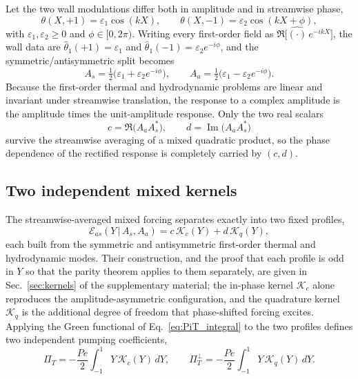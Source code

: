\documentclass[12pt,a4paper]{article}
\newcommand{\Pe}{\mathit{Pe}}
\newcommand{\PiT}{\Pi_T}
\begin{document}
Let the two wall modulations differ both in amplitude and in streamwise phase,
\begin{equation}
  \theta(X,+1)=\varepsilon_1\cos(kX),\qquad
  \theta(X,-1)=\varepsilon_2\cos(kX+\phi),
  \label{eq:phase_forcing}
\end{equation}
with $\varepsilon_1,\varepsilon_2\ge0$ and $\phi\in[0,2\pi)$. Writing every first-order
field as $\Re\!\big[\widehat{(\cdot)}\,e^{-ikX}\big]$, the wall data are
$\widehat\theta_1(+1)=\varepsilon_1$ and
$\widehat\theta_1(-1)=\varepsilon_2 e^{-i\phi}$, and the symmetric/antisymmetric
split becomes
\begin{equation}
  A_s=\tfrac12\big(\varepsilon_1+\varepsilon_2e^{-i\phi}\big),\qquad
  A_a=\tfrac12\big(\varepsilon_1-\varepsilon_2e^{-i\phi}\big).
  \label{eq:complex_amps}
\end{equation}
Because the first-order thermal and hydrodynamic problems are linear and invariant
under streamwise translation, the response to a complex amplitude is the amplitude
times the unit-amplitude response. Only the two real scalars
\begin{equation}
  c=\Re\!\big(A_aA_s^{*}\big),\qquad
  d=\operatorname{Im}\!\big(A_aA_s^{*}\big)
  \label{eq:cd_def}
\end{equation}
survive the streamwise averaging of a mixed quadratic product, so the phase
dependence of the rectified response is completely carried by $(c,d)$.

\subsection{Two independent mixed kernels}

The streamwise-averaged mixed forcing separates exactly into two fixed profiles,
\begin{equation}
  \mathcal E_{as}(Y\,|\,A_s,A_a)
  =c\,\mathcal K_c(Y)+d\,\mathcal K_q(Y),
  \label{eq:mixed_forcing_two}
\end{equation}
each built from the symmetric and antisymmetric first-order thermal and hydrodynamic
modes. Their construction, and the proof that each profile is odd in $Y$ so that the
parity theorem applies to them separately, are given in
Sec.~\ref{sec:kernels} of the supplementary material; the in-phase kernel $\mathcal K_c$ alone
reproduces the amplitude-asymmetric configuration, and the quadrature kernel
$\mathcal K_q$ is the additional degree of freedom that phase-shifted forcing excites.
Applying the Green functional of Eq.~\eqref{eq:PiT_integral} to the two profiles defines
two independent pumping coefficients,
\begin{equation}
  \PiT=-\frac{\Pe}{2}\int_{-1}^{1}Y\,\mathcal K_c(Y)\,dY,\qquad
  \PiT^{\perp}=-\frac{\Pe}{2}\int_{-1}^{1}Y\,\mathcal K_q(Y)\,dY .
  \label{eq:two_coeffs}
\end{equation}
\end{document}
